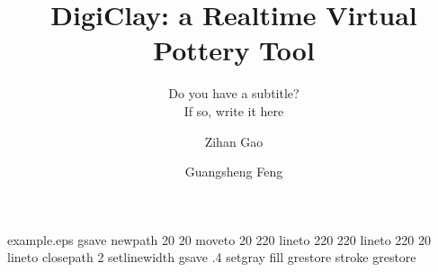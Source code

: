 %
%
%
%
%
\begin{filecontents*}{example.eps}
gsave
newpath
  20 20 moveto
  20 220 lineto
  220 220 lineto
  220 20 lineto
closepath
2 setlinewidth
gsave
  .4 setgray fill
grestore
stroke
grestore
\end{filecontents*}
%
\RequirePackage{fix-cm}
%
\documentclass[smallextended]{svjour3}       %
%
\smartqed  %
%
\usepackage{graphicx}
%
%
%
%
%


\title{DigiClay: a Realtime Virtual Pottery Tool%
}
\subtitle{Do you have a subtitle?\\ If so, write it here}


\author{Zihan Gao         \and
        Guangsheng Feng %
}



